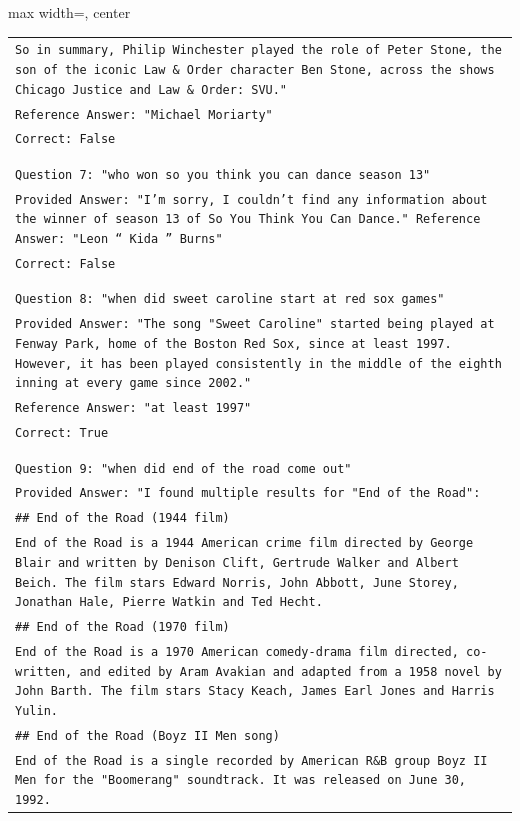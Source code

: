 \documentclass[11pt]{article}
\begin{document}
\begin{table}[ht]
\begin{adjustbox}{max width=\textwidth, center}
\begin{tabular}{>{\raggedright\arraybackslash\tt}p{}<{}}
So in summary, Philip Winchester played the role of Peter Stone, the son of the iconic Law \& Order character Ben Stone, across the shows Chicago Justice and Law \& Order: SVU."\\
Reference Answer: "Michael Moriarty"\\
Correct: False\\
\\
\\
Question 7: "who won so you think you can dance season 13"\\
Provided Answer: "I'm sorry, I couldn't find any information about the winner of season 13 of So You Think You Can Dance."
Reference Answer: "Leon `` Kida '' Burns"\\
Correct: False\\
\\
\\
Question 8: "when did sweet caroline start at red sox games"\\
Provided Answer: "The song "Sweet Caroline" started being played at Fenway Park, home of the Boston Red Sox, since at least 1997. However, it has been played consistently in the middle of the eighth inning at every game since 2002."\\
Reference Answer: "at least 1997"\\
Correct: True\\
\\
\\
Question 9: "when did end of the road come out"\\
Provided Answer: "I found multiple results for "End of the Road":
\\
\#\# End of the Road (1944 film)\\
End of the Road is a 1944 American crime film directed by George Blair and written by Denison Clift, Gertrude Walker and Albert Beich. The film stars Edward Norris, John Abbott, June Storey, Jonathan Hale, Pierre Watkin and Ted Hecht.
\\
\#\# End of the Road (1970 film)\\
End of the Road is a 1970 American comedy-drama film directed, co-written, and edited by Aram Avakian and adapted from a 1958 novel by John Barth. The film stars Stacy Keach, James Earl Jones and Harris Yulin.
\\
\#\# End of the Road (Boyz II Men song)\\
End of the Road is a single recorded by American R\&B group Boyz II Men for the "Boomerang" soundtrack. It was released on June 30, 1992.\\

\end{tabular}
\end{adjustbox}
\end{table}
\end{document}
